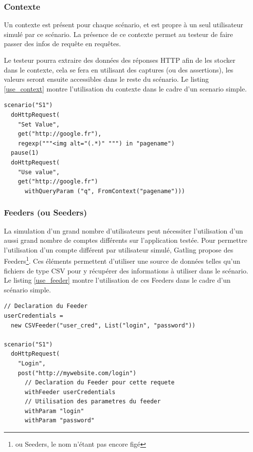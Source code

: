 \subsubsection{Contexte}
Un contexte est présent pour chaque scénario, et est propre à un seul utilisateur simulé par ce scénario. La présence de ce contexte permet au testeur de faire passer des infos de requête en requêtes.

Le testeur pourra extraire des données des réponses HTTP afin de les stocker dans le contexte, cela se fera en utilisant des captures (ou des assertions), les valeurs seront ensuite accessibles dans le reste du scénario. Le listing \ref{use_context} montre l'utilisation du contexte dans le cadre d'un scenario simple.

\begin{lstlisting}[caption={Utilisation du contexte},label={use_context}]
scenario("S1")
  doHttpRequest(
    "Set Value",
    get("http://google.fr"),
    regexp("""<img alt="(.*)" """) in "pagename")
  pause(1)
  doHttpRequest(
  	"Use value",
  	get("http://google.fr") 
  	  withQueryParam ("q", FromContext("pagename")))
\end{lstlisting}

\subsubsection{Feeders (ou Seeders)}
La simulation d'un grand nombre d'utilisateurs peut nécessiter l'utilisation d'un aussi grand nombre de comptes différents sur l'application testée. Pour permettre l'utilisation d'un compte différent par utilisateur simulé, Gatling propose des Feeders\footnote{ou Seeders, le nom n'étant pas encore figé}. Ces éléments permettent d'utiliser une source de données telles qu'un fichiers de type CSV pour y récupérer des informations à utiliser dans le scénario. Le listing \ref{use_feeder} montre l'utilisation de ces Feeders dans le cadre d'un scénario simple.

\begin{lstlisting}[caption={Utilisation des Feeders},label={use_feeder}]
// Declaration du Feeder
userCredentials = 
  new CSVFeeder("user_cred", List("login", "password"))

scenario("S1")
  doHttpRequest(
    "Login",
    post("http://mywebsite.com/login")
      // Declaration du Feeder pour cette requete
      withFeeder userCredentials
      // Utilisation des parametres du feeder
      withParam "login"
      withParam "password"
\end{lstlisting}